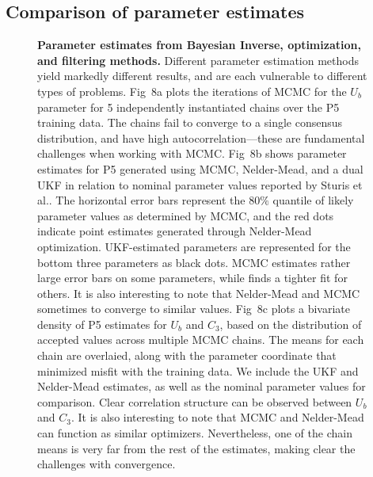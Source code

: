 \documentclass[10pt,letterpaper]{article}
\begin{document}
\subsection{Comparison of parameter estimates}

\begin{figure}[!h]
  \centering
    \begin{adjustwidth}{-2.25in}{0in} %

\par
  \caption{{\bf Parameter estimates from Bayesian Inverse, optimization, and filtering methods.}
  Different parameter estimation methods yield markedly different results, and are each vulnerable to different types of problems. 
  Fig~8a plots the iterations of MCMC for the $U_b$ parameter for 5 independently instantiated chains over the P5 training data. The chains fail to converge to a single consensus distribution, and have high autocorrelation---these are fundamental challenges when working with MCMC.
  Fig~8b shows parameter estimates for P5 generated using MCMC, Nelder-Mead, and a dual UKF in relation to nominal parameter values reported by Sturis et al.. The horizontal error bars represent the $80\%$ quantile of likely parameter values as determined by MCMC, and the red dots indicate point estimates generated through Nelder-Mead optimization. UKF-estimated parameters are represented for the bottom three parameters as black dots. MCMC estimates rather large error bars on some parameters, while finds a tighter fit for others. It is also interesting to note that Nelder-Mead and MCMC sometimes to converge to similar values.
  Fig~8c plots a bivariate density of P5 estimates for $U_b$ and $C_3$, based on the distribution of accepted values across multiple MCMC chains. The means for each chain are overlaied, along with the parameter coordinate that minimized misfit with the training data. We include the UKF and Nelder-Mead estimates, as well as the nominal parameter values for comparison. Clear correlation structure can be observed between $U_b$ and $C_3$. It is also interesting to note that MCMC and Nelder-Mead can function as similar optimizers. Nevertheless, one of the chain means is very far from the rest of the estimates, making clear the challenges with convergence.}
  \label{fig:parameters}
  \end{adjustwidth}
\end{figure}
\end{document}
